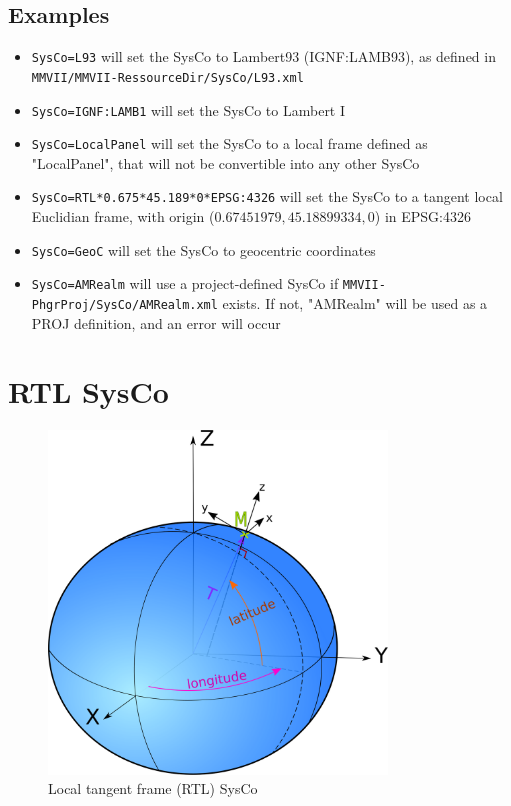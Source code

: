 \subsection{Examples}
\begin{itemize}
\item {\tt SysCo=L93} will set the SysCo to Lambert93 (IGNF:LAMB93), as defined in \\
{\tt MMVII/MMVII-RessourceDir/SysCo/L93.xml}
\item {\tt SysCo=IGNF:LAMB1} will set the SysCo to Lambert I
\item {\tt SysCo=LocalPanel} will set the SysCo to a local frame defined as "LocalPanel", that will not be convertible into any other SysCo
\item {\tt SysCo=RTL*0.675*45.189*0*EPSG:4326} will set the SysCo to a tangent local Euclidian frame, with origin ($0.67451979, 45.18899334, 0$) in EPSG:4326
\item {\tt SysCo=GeoC} will set the SysCo to geocentric coordinates
\item {\tt SysCo=AMRealm} will use a project-defined SysCo if {\tt MMVII-PhgrProj/SysCo/AMRealm.xml} exists. If not, "AMRealm" will be used as a PROJ definition, and an error will occur

\end{itemize}


\section{RTL SysCo}
\label{SysCoRTL}

\begin{figure}[h!]
\centering
\includegraphics[width=9cm]{CommandReferences/ImagesComRef/cart_geocentr.png}
\caption{Local tangent frame (RTL) SysCo}
\label{fig:RTL}
\end{figure}


